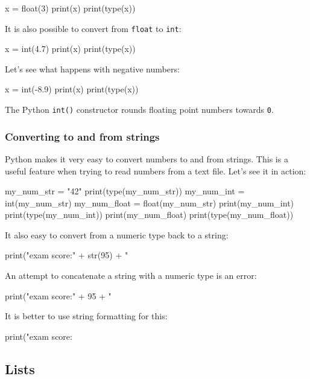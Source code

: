 \documentclass[12pt]{article} \newif\ifsolution\solutiontrue %
\begin{document}
\begin{python}
x = float(3)
print(x)
print(type(x))
\end{python}

It is also possible to convert from \texttt{float} to \texttt{int}:

\begin{python}
x = int(4.7) print(x) print(type(x))
\end{python}

Let's see what happens with negative numbers:

\begin{python}
x = int(-8.9) print(x) print(type(x))
\end{python}

The Python \texttt{int()} constructor rounds floating point numbers
towards \texttt{0}.

\subsubsection{Converting to and from
strings}\label{converting-to-and-from-strings}

Python makes it very easy to convert numbers to and from strings. This
is a useful feature when trying to read numbers from a text file. Let's
see it in action:

\begin{python}
my_num_str = "42" print(type(my_num_str))  my_num_int = int(my_num_str) my_num_float = float(my_num_str)  print(my_num_int) print(type(my_num_int))  print(my_num_float) print(type(my_num_float))
\end{python}

It also easy to convert from a numeric type back to a string:

\begin{python}
print("exam score:" + str(95) + "%
\end{python}

An attempt to concatenate a string with a numeric type is an error:

\begin{python}
print("exam score:" + 95 + "%
\end{python}

It is better to use string formatting for this:

\begin{python}
print("exam score: {}%
\end{python}


\subsection{Lists}\label{lists}
\end{document}
